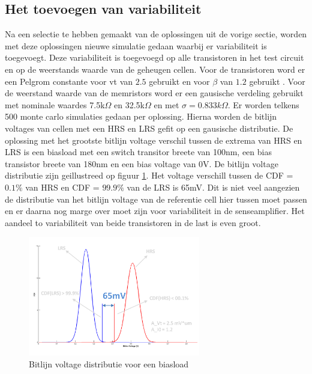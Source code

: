 \subsection{Het toevoegen van variabiliteit}\label{sec:varload}
Na een selectie te hebben gemaakt van de oplossingen uit de vorige sectie, worden met deze oplossingen nieuwe simulatie gedaan waarbij er variabiliteit is toegevoegt. Deze variabiliteit is toegevoegd op alle transistoren in het test circuit en op de weerstands waarde van de geheugen cellen. Voor de transistoren word er een Pelgrom constante voor vt van $2.5$ gebruikt en voor $\beta$ van $1.2$ gebruikt \cite{ppt:variatie}. Voor de weerstand waarde van de memristors word er een gausische verdeling gebruikt met nominale waardes 7.5k$\Omega$ en 32.5k$\Omega$ en met $\sigma = 0.833k\Omega$. Er worden telkens 500 monte carlo simulaties gedaan per oplossing. Hierna worden de bitlijn voltages van cellen met een HRS en LRS gefit op een gausische distributie. De oplossing met het grootste bitlijn voltage verschil tussen de extrema van HRS en LRS is een biasload met een switch transitor breete van 100nm, een bias transistor breete van 180nm en een bias voltage van 0V. De bitlijn voltage distributie zijn geillustreed op figuur \ref{fig:distbias}. Het voltage verschill tussen de CDF = $0.1\%$ van HRS en CDF = $99.9\%$ van de LRS is 65mV. Dit is niet veel aangezien de distributie van het bitlijn voltage van de referentie cell hier tussen moet passen en er daarna nog marge over moet zijn voor variabiliteit in de senseamplifier. Het aandeel to variabiliteit van beide transistoren in de last is even groot.

\begin{figure}[!h]
  \centering
  \includegraphics[width=0.67\textwidth]{../fig/hfdst-last-var1.png}
  \caption{Bitlijn voltage distributie voor een biasload}
  \label{fig:distbias}
\end{figure}


